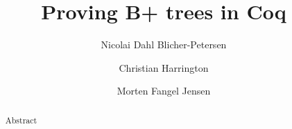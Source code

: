 \documentclass[oribibl]{llncs}
\begin{document}
\mainmatter
\title{Proving B+ trees in Coq}
\author{Nicolai Dahl Blicher-Petersen \and Christian Harrington \and Morten Fangel Jensen \\
}

\maketitle

\begin{abstract}
Abstract
\end{abstract}









\end{document}
